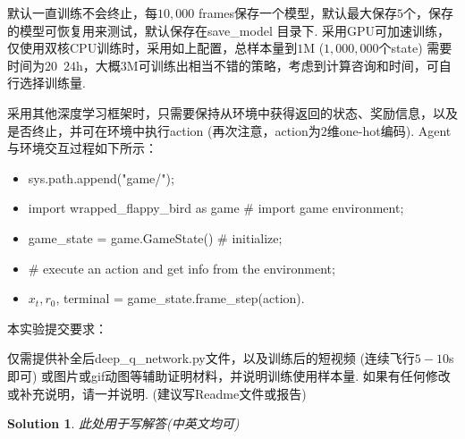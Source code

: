 \documentclass[a4paper,UTF8]{article}
\numberwithin{equation}{section}
\newtheorem*{mySol}{Solution}
\begin{document}
默认一直训练不会终止，每$10,000$ frames保存一个模型，默认最大保存$5$个，保存的模型可恢复用来测试，默认保存在save\_model 目录下. 采用GPU可加速训练，仅使用双核CPU训练时，采用如上配置，总样本量到$1$M ($1,000,000$个state) 需要时间为$20$~$24$h，大概$3$M可训练出相当不错的策略，考虑到计算咨询和时间，可自行选择训练量.

采用其他深度学习框架时，只需要保持从环境中获得返回的状态、奖励信息，以及是否终止，并可在环境中执行action (再次注意，action为$2$维one-hot编码). Agent与环境交互过程如下所示：
\begin{itemize}
	\item sys.path.append("game/");
	\item import wrapped\_flappy\_bird as game \# import game environment;
	\item game\_state = game.GameState() \# initialize;
	\item \# execute an action and get info from the environment;
	\item $x_t, r_0$, terminal = game\_state.frame\_step(action).
\end{itemize}

本实验提交要求：

仅需提供补全后deep\_q\_network.py文件，以及训练后的短视频 (连续飞行$5-10$s 即可) 或图片或gif动图等辅助证明材料，并说明训练使用样本量. 如果有任何修改或补充说明，请一并说明. (建议写Readme文件或报告)



\begin{mySol}
此处用于写解答(中英文均可)

\end{mySol}
\newpage




\end{document}
